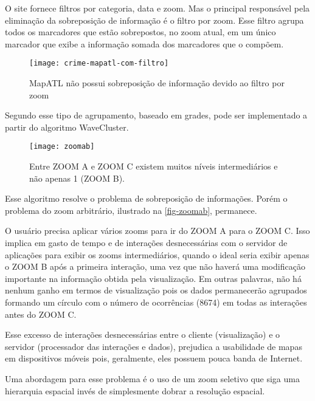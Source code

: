 O site fornece filtros por categoria, data e zoom. Mas o principal responsável pela eliminação da sobreposição de informação é o filtro por zoom. Esse filtro agrupa todos os marcadores que estão sobrepostos, no zoom atual, em um único marcador que exibe a informação somada dos marcadores que o compõem.
 
\begin{figure}[htb]
	\caption{\label{fig-mapatl} MapATL não possui sobreposição de informação devido ao filtro por zoom}
	\begin{center}
	    \texttt{[image: crime-mapatl-com-filtro]}
	\end{center}
\end{figure}

Segundo \cite[42,44]{silva2010solap+} esse tipo de agrupamento, baseado em grades, pode ser implementado a partir do algoritmo WaveCluster\cite{wavecluster}. 

 

\begin{figure}[htb]
	\caption{\label{fig-zoomab} Entre ZOOM A e ZOOM C existem muitos níveis intermediários e não apenas 1 (ZOOM B).}
	\begin{center}
	    \texttt{[image: zoomab]}
	\end{center}
\end{figure}

Esse algoritmo resolve o problema de sobreposição de informações. Porém o problema do zoom arbitrário, ilustrado na \autoref{fig-zoomab}, permanece.

O usuário precisa aplicar vários zooms para ir do ZOOM A para o ZOOM C. Isso implica em gasto de tempo e de interações desnecessárias com o servidor de aplicações para exibir os zooms intermediários, quando o ideal seria exibir apenas o ZOOM B após a primeira interação, uma vez que não haverá uma modificação importante na informação obtida pela visualização. Em outras palavras, não há nenhum ganho em termos de visualização pois os dados permanecerão agrupados formando um círculo com o número de ocorrências (8674) em todas as interações antes do ZOOM C.

Esse excesso de interações desnecessárias entre o cliente (visualização) e o servidor (processador das interações e dados), prejudica a usabilidade de mapas em dispositivos móveis pois, geralmente, eles possuem pouca banda de Internet.

Uma abordagem para esse problema é o uso de um zoom seletivo que siga uma hierarquia espacial invés de simplesmente dobrar a resolução espacial. 

